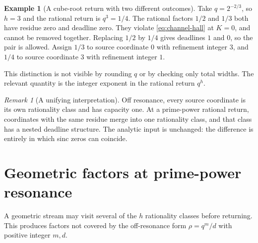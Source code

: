 \documentclass[11pt,letterpaper]{article}
\theoremstyle{definition}
\newtheorem{example}[theorem]{Example}
\theoremstyle{remark}
\newtheorem{remark}[theorem]{Remark}
\numberwithin{equation}{section}
\begin{document}
\begin{example}[A cube-root return with two different outcomes]\label{ex:cuberoot}
Take $q=2^{-2/3}$, so $h=3$ and the rational return is $q^3=1/4$. The rational factors $1/2$ and $1/3$ both have residue zero and deadline zero. They violate \eqref{eq:channel-hall} at $K=0$, and cannot be removed together. Replacing $1/2$ by $1/4$ gives deadlines $1$ and $0$, so the pair is allowed. Assign $1/3$ to source coordinate $0$ with refinement integer $3$, and $1/4$ to source coordinate $3$ with refinement integer $1$.

This distinction is not visible by rounding $q$ or by checking only total widths. The relevant quantity is the integer exponent in the rational return $q^h$.
\end{example}

\begin{remark}[A unifying interpretation]
Off resonance, every source coordinate is its own rationality class and has capacity one. At a prime-power rational return, coordinates with the same residue merge into one rationality class, and that class has a nested deadline structure. The analytic input is unchanged: the difference is entirely in which sinc zeros can coincide.
\end{remark}

\section{Geometric factors at prime-power resonance}\label{sec:orbits}
A geometric stream may visit several of the $h$ rationality classes before returning. This produces factors not covered by the off-resonance form $\rho=q^m/d$ with positive integer $m,d$.
\end{document}

